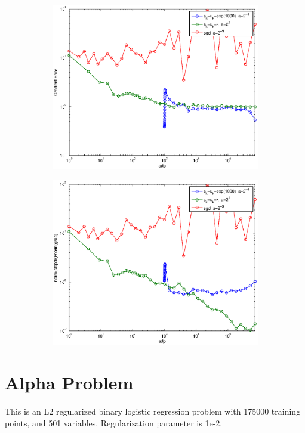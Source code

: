 \documentclass[12pt]{article}
\begin{document}
\begin{figure}[H]
	\begin{subfigure}[b]{.5\linewidth}
		        \includegraphics[width=4in]{Figures/18-2-3.eps}
	\end{subfigure}%
	\begin{subfigure}[b]{.5\linewidth}
		        \includegraphics[width=4in]{Figures/18-2-4.eps}
	\end{subfigure}%
	\end{figure}
	
	\newpage
	
	\section{Alpha Problem}
	
	This is an L2 regularized binary logistic regression problem with 175000 training points, and 501 variables. Regularization parameter is 1e-2.
	
	
\end{document}
